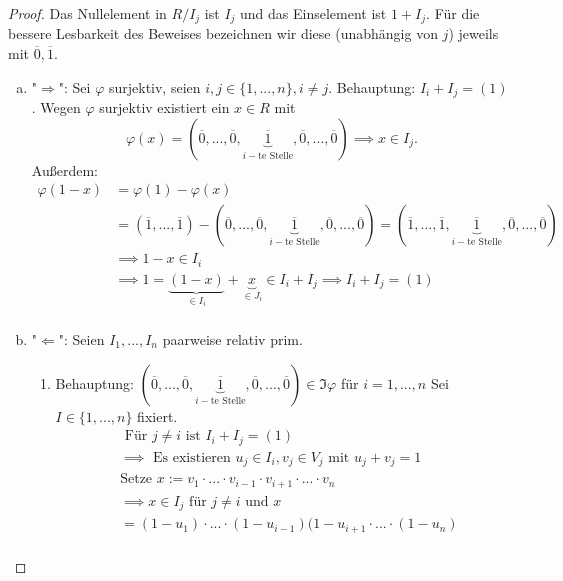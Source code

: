 \documentclass[a4paper, titlepage]{article}
\theoremstyle{definition}
\begin{document}
\begin{proof}
    Das Nullelement in $R/I_j$ ist $I_j$ und das Einselement ist $1+I_j$. Für die bessere Lesbarkeit des Beweises bezeichnen wir diese (unabhängig von $j$) jeweils mit $\overline{0},\overline{1}$.
    \begin{enumerate}[(a)]
        \item "$\Rightarrow$": Sei $\varphi$ surjektiv, seien $i,j\in \{1,...,n\},i\neq j$.
        \newline
         Behauptung: $I_i+I_j=(1)$. Wegen $\varphi$ surjektiv existiert ein $x\in R$ mit $$\varphi(x)=(\overline{0},...,\overline{0},\underbrace{\overline{1}}_{i-\text{te Stelle}},\overline{0},...,\overline{0})\implies x\in I_j.$$
            Außerdem: \begin{align*}
                \varphi(1-x)&=\varphi(1)-\varphi(x)\\
                &=(\overline{1},...,\overline{1})-(\overline{0},...,\overline{0},\underbrace{\overline{1}}_{i-\text{te Stelle}},\overline{0},...,\overline{0}) = (\overline{1},...,\overline{1},\underbrace{\overline{1}}_{i-\text{te Stelle}},\overline{0},...,\overline{0})\\
            &\implies 1-x\in I_i\\
            &\implies 1 = \underbrace{(1-x)}_{\in I_i}+\underbrace{x}_{\in J_i}\in I_i+I_j\implies I_i+I_j=(1)\\
            \end{align*}
        \item "$\Leftarrow$": Seien $I_1,...,I_n$ paarweise relativ prim. 
        \begin{enumerate}
            \item Behauptung: $(\overline{0},...,\overline{0},\underbrace{\overline{1}}_{i-\text{te Stelle}},\overline{0},...,\overline{0})\in \Im \varphi$ für $i=1,...,n$
                Sei $I\in \{1,...,n\}$ fixiert.
                \begin{align*} &\text{ Für } j\neq i \text{ ist } I_i+I_j=(1)\\
                    &\implies \text{ Es existieren } u_j\in I_i, v_j\in V_j \text{ mit } u_j+v_j=1\\
                    &\text{Setze } x:=v_1\cdot...\cdot v_{i-1}\cdot v_{i+1}\cdot...\cdot v_n\\
                    &\implies x\in I_j\text{ für }j\neq i \text{ und } x \\
                    &= (1-u_{1})\cdot...\cdot(1-u_{i-1})(1-u_{i+1}\cdot...\cdot(1-u_n)\\

\end{align*}
\end{enumerate}
\end{enumerate}
\end{proof}
\end{document}
